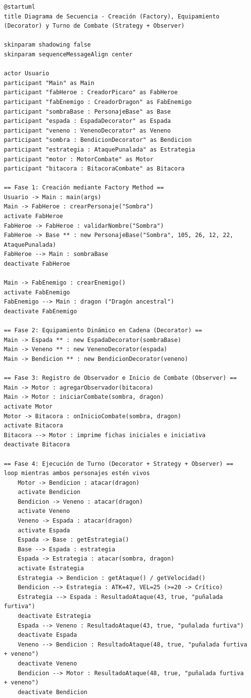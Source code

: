\documentclass[12pt,letterpaper]{article}
\begin{document}
\begin{lstlisting}[caption={Código fuente PlantUML del Diagrama de Secuencia (\texttt{diagramas/diagrama\_secuencia.puml}).}]
@startuml
title Diagrama de Secuencia - Creación (Factory), Equipamiento (Decorator) y Turno de Combate (Strategy + Observer)

skinparam shadowing false
skinparam sequenceMessageAlign center

actor Usuario
participant "Main" as Main
participant "fabHeroe : CreadorPicaro" as FabHeroe
participant "fabEnemigo : CreadorDragon" as FabEnemigo
participant "sombraBase : PersonajeBase" as Base
participant "espada : EspadaDecorator" as Espada
participant "veneno : VenenoDecorator" as Veneno
participant "sombra : BendicionDecorator" as Bendicion
participant "estrategia : AtaquePunalada" as Estrategia
participant "motor : MotorCombate" as Motor
participant "bitacora : BitacoraCombate" as Bitacora

== Fase 1: Creación mediante Factory Method ==
Usuario -> Main : main(args)
Main -> FabHeroe : crearPersonaje("Sombra")
activate FabHeroe
FabHeroe -> FabHeroe : validarNombre("Sombra")
FabHeroe -> Base ** : new PersonajeBase("Sombra", 105, 26, 12, 22, AtaquePunalada)
FabHeroe --> Main : sombraBase
deactivate FabHeroe

Main -> FabEnemigo : crearEnemigo()
activate FabEnemigo
FabEnemigo --> Main : dragon ("Dragón ancestral")
deactivate FabEnemigo

== Fase 2: Equipamiento Dinámico en Cadena (Decorator) ==
Main -> Espada ** : new EspadaDecorator(sombraBase)
Main -> Veneno ** : new VenenoDecorator(espada)
Main -> Bendicion ** : new BendicionDecorator(veneno)

== Fase 3: Registro de Observador e Inicio de Combate (Observer) ==
Main -> Motor : agregarObservador(bitacora)
Main -> Motor : iniciarCombate(sombra, dragon)
activate Motor
Motor -> Bitacora : onInicioCombate(sombra, dragon)
activate Bitacora
Bitacora --> Motor : imprime fichas iniciales e iniciativa
deactivate Bitacora

== Fase 4: Ejecución de Turno (Decorator + Strategy + Observer) ==
loop mientras ambos personajes estén vivos
    Motor -> Bendicion : atacar(dragon)
    activate Bendicion
    Bendicion -> Veneno : atacar(dragon)
    activate Veneno
    Veneno -> Espada : atacar(dragon)
    activate Espada
    Espada -> Base : getEstrategia()
    Base --> Espada : estrategia
    Espada -> Estrategia : atacar(sombra, dragon)
    activate Estrategia
    Estrategia -> Bendicion : getAtaque() / getVelocidad()
    Bendicion --> Estrategia : ATK=47, VEL=25 (>=20 -> Crítico)
    Estrategia --> Espada : ResultadoAtaque(43, true, "puñalada furtiva")
    deactivate Estrategia
    Espada --> Veneno : ResultadoAtaque(43, true, "puñalada furtiva")
    deactivate Espada
    Veneno --> Bendicion : ResultadoAtaque(48, true, "puñalada furtiva + veneno")
    deactivate Veneno
    Bendicion --> Motor : ResultadoAtaque(48, true, "puñalada furtiva + veneno")
    deactivate Bendicion


\end{lstlisting}
\end{document}
